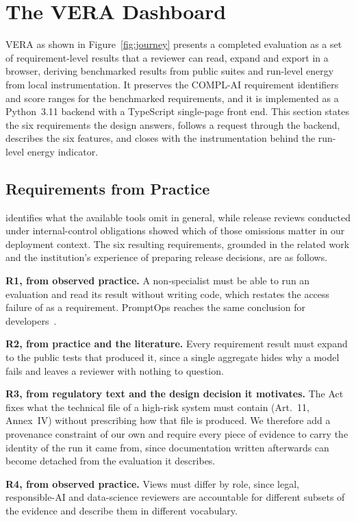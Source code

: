 \documentclass[10pt,conference]{IEEEtran}
\begin{document}
\section{The VERA Dashboard}
\label{sec:vera}
VERA as shown in Figure~\ref{fig:journey} presents a completed evaluation as a set of requirement-level results that a reviewer can read, expand and export in a browser, deriving benchmarked results from public suites and run-level energy from local instrumentation.
It preserves the COMPL-AI requirement identifiers and score ranges for the benchmarked requirements, and it is implemented as a Python~3.11 backend with a TypeScript single-page front end.
This section states the six requirements the design answers, follows a request through the backend, describes the six features, and closes with the instrumentation behind the run-level energy indicator.

\subsection{Requirements from Practice}
\label{sec:requirements}
 identifies what the available tools omit in general, while release reviews conducted under internal-control obligations showed which of those omissions matter in our deployment context.
The six resulting requirements, grounded in the related work and the institution's experience of preparing release decisions, are as follows.

\textbf{R1, from observed practice.}
A non-specialist must be able to run an evaluation and read its result without writing code, which restates the access failure of  as a requirement.
PromptOps reaches the same conclusion for developers~\cite{sunetnanta2025promptops}.

\textbf{R2, from practice and the literature.}
Every requirement result must expand to the public tests that produced it, since a single aggregate hides why a model fails and leaves a reviewer with nothing to question.

\textbf{R3, from regulatory text and the design decision it motivates.}
The Act fixes what the technical file of a high-risk system must contain (Art.~11, Annex~IV) without prescribing how that file is produced.
We therefore add a provenance constraint of our own and require every piece of evidence to carry the identity of the run it came from, since documentation written afterwards can become detached from the evaluation it describes.

\textbf{R4, from observed practice.}
Views must differ by role, since legal, responsible-AI and data-science reviewers are accountable for different subsets of the evidence and describe them in different vocabulary.
\end{document}
